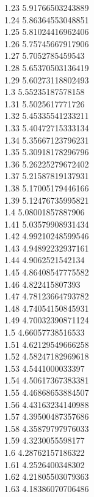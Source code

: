 {1.23	5.91766503243889\\
1.24	5.86364553048851\\
1.25	5.81024416962406\\
1.26	5.75745667917906\\
1.27	5.7052785459543\\
1.28	5.65370503136419\\
1.29	5.60273118802493\\
1.3	5.55235187578158\\
1.31	5.5025617771726\\
1.32	5.45335541233211\\
1.33	5.40472715333134\\
1.34	5.35667123796231\\
1.35	5.30918178296796\\
1.36	5.26225279672402\\
1.37	5.21587819137931\\
1.38	5.17005179446166\\
1.39	5.12476735995821\\
1.4	5.08001857887906\\
1.41	5.03579908931434\\
1.42	4.99210248599546\\
1.43	4.94892232937161\\
1.44	4.9062521542134\\
1.45	4.86408547775582\\
1.46	4.822415807393\\
1.47	4.78123664793782\\
1.48	4.74054150845931\\
1.49	4.70032390871124\\
1.5	4.66057738516533\\
1.51	4.62129549666258\\
1.52	4.58247182969618\\
1.53	4.5441000033397\\
1.54	4.50617367383381\\
1.55	4.46868653884507\\
1.56	4.43163234140988\\
1.57	4.39500487357686\\
1.58	4.35879797976033\\
1.59	4.3230055598177\\
1.6	4.28762157186322\\
1.61	4.2526400348302\\
1.62	4.21805503079363\\
1.63	4.18386070706486\\
}
